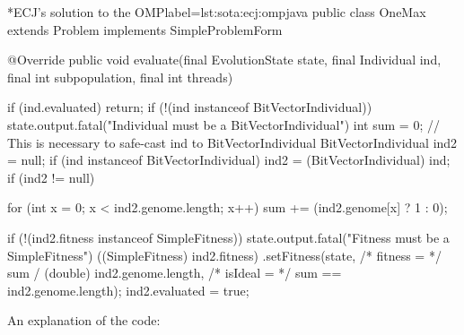   \begin{code}*{ECJ's solution to the OMP}{label=lst:sota:ecj:omp}{java}
    public class OneMax extends Problem implements SimpleProblemForm {
      @Override
      public void evaluate(final EvolutionState state,
                          final Individual ind,
                          final int subpopulation,
                          final int threads) {
        if (ind.evaluated) {
          return;
        }
        if (!(ind instanceof BitVectorIndividual)) {
          state.output.fatal("Individual must be a BitVectorIndividual")
        }
        int sum = 0;
        // This is necessary to safe-cast ind to BitVectorIndividual
        BitVectorIndividual ind2 = null;
        if (ind instanceof BitVectorIndividual) {
          ind2 = (BitVectorIndividual) ind;
        }
        if (ind2 != null) {
          for (int x = 0; x < ind2.genome.length; x++) {
            sum += (ind2.genome[x] ? 1 : 0);
          }

          if (!(ind2.fitness instanceof SimpleFitness)) {
            state.output.fatal("Fitness must be a SimpleFitness")
          }
          ((SimpleFitness) ind2.fitness)
              .setFitness(state,
                  /* fitness = */ sum / (double) ind2.genome.length,
                  /* isIdeal = */ sum == ind2.genome.length);
          ind2.evaluated = true;
        }
      }
    }
  \end{code}

  An explanation of the code:

